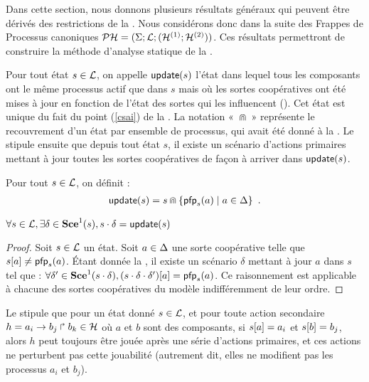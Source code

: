 Dans cette section, nous donnons plusieurs résultats généraux qui peuvent être dérivés des
restrictions de la .
Nous considérons donc dans la suite des Frappes de Processus
canoniques $\mathcal{PH} = (\Sigma; \mathcal{L}; (\mathcal{H}^{(1)}; \mathcal{H}^{(2)}))$.
Ces résultats permettront de construire la méthode d'analyse statique de la .

Pour tout état $s \in \mathcal{L}$, on appelle $\mathsf{update}(s)$ l'état dans lequel tous les composants
ont le même processus actif que dans $s$
mais où les sortes coopératives ont été mises à jour en fonction
de l'état des sortes qui les influencent ().
Cet état est unique du fait du point (\ref{csai}) de la .
La notation «~$\Cap$~» représente le recouvrement d'un état par ensemble de processus,
qui avait été donné à la .
Le  stipule ensuite que depuis tout état $s$, il existe un scénario d'actions primaires
mettant à jour toutes les sortes coopératives de façon à arriver dans $\mathsf{update}(s)$.

\begin{definition}[$\update : \PHl \rightarrow \PHl$]
  Pour tout $s \in \mathcal{L}$, on définit :
  \begin{align*}
    \mathsf{update}(s) = s \Cap \{ \mathsf{pfp}_{s}(a) \mid a \in \Delta \} \enspace.
  \end{align*}
\end{definition}

\begin{lemma}
  $\forall s \in \mathcal{L}, \exists \delta \in \mathbf{Sce}^1(s), s \cdot \delta = \mathsf{update}(s)$
\end{lemma}

\begin{proof} %
  Soit $s \in \mathcal{L}$ un état.
  Soit $a \in \Delta$ une sorte coopérative telle que ${s[a]} \neq \mathsf{pfp}_s(a)$.
  Étant donnée la , il existe un scénario $\delta$ mettant à jour $a$
  dans $s$ tel que :
  $\forall \delta' \in \mathbf{Sce}^1(s \cdot \delta),
    {(s \cdot \delta \cdot \delta')[a]} = \mathsf{pfp}_s(a)$.
  Ce raisonnement est applicable à chacune des sortes coopératives du modèle
  indifféremment de leur ordre.
\end{proof}

Le  stipule que pour un état donné $s \in \mathcal{L}$, et pour toute action secondaire
$h = a_i\rightarrow b_j\Rsh b_k \in \mathcal{H}$ où $a$ et $b$ sont des composants,
si ${s[a]} = a_i$ et ${s[b]} = b_j$, alors
$h$ peut toujours être jouée après une série d'actions primaires,
et ces actions ne perturbent pas cette jouabilité
(autrement dit, elles ne modifient pas les processus $a_i$ et $b_j$).

